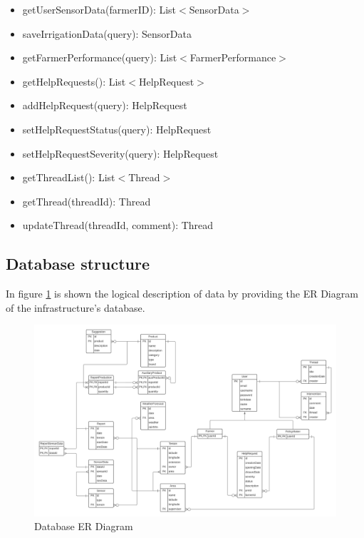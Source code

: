 \documentclass[10pt]{article} %
\begin{document}
\begin{itemize}
\begin{itemize}
        \item getUserSensorData(farmerID): List$<$SensorData$>$
        \item saveIrrigationData(query): SensorData
        \item getFarmerPerformance(query): List$<$FarmerPerformance$>$
        \item getHelpRequests(): List$<$HelpRequest$>$
        \item addHelpRequest(query): HelpRequest
        \item setHelpRequestStatus(query): HelpRequest
        \item setHelpRequestSeverity(query): HelpRequest
        \item getThreadList(): List$<$Thread$>$
        \item getThread(threadId): Thread
        \item updateThread(threadId, comment): Thread
    \end{itemize}
\end{itemize}
\newpage
\subsection{Database structure}
In figure \ref{fig:er} is shown the logical description of data by providing the ER Diagram of the infrastructure's database.
\begin{figure}[h!]
    \centering
    \centerline{\includegraphics[scale=0.5]{images/er.png}}
    \caption{Database ER Diagram}
    \label{fig:er}
\end{figure}
\newpage
\end{document}
